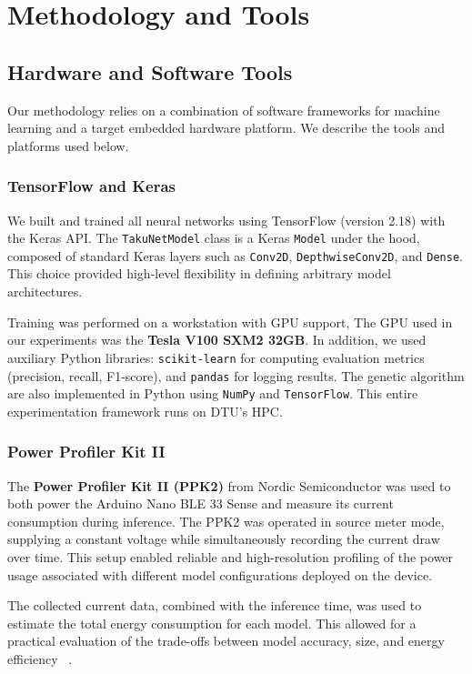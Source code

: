\chapter{Methodology and Tools}
\label{chap:Methodology}

\section{Hardware and Software Tools}

Our methodology relies on a combination of software frameworks for machine learning and a target embedded hardware platform. We describe the tools and platforms used below.

\subsection*{TensorFlow and Keras}

We built and trained all neural networks using TensorFlow (version 2.18) with the Keras API. The \texttt{TakuNetModel} class is a Keras \texttt{Model} under the hood, composed of standard Keras layers such as \texttt{Conv2D}, \texttt{DepthwiseConv2D}, and \texttt{Dense}. This choice provided high-level flexibility in defining arbitrary model architectures.

Training was performed on a workstation with GPU support, The GPU used in our experiments was the \textbf{Tesla V100 SXM2 32GB}.
In addition, we used auxiliary Python libraries: \texttt{scikit-learn} for computing evaluation metrics (precision, recall, F1-score), and \texttt{pandas} for logging results. The genetic algorithm are also implemented in Python using \texttt{NumPy} and \texttt{TensorFlow}. This entire experimentation framework runs on DTU's HPC.

\subsection*{Power Profiler Kit II}

The \textbf{Power Profiler Kit II (PPK2)} from Nordic Semiconductor was used to both power the Arduino Nano BLE 33 Sense and measure its current consumption during inference. The PPK2 was operated in source meter mode, supplying a constant voltage while simultaneously recording the current draw over time. This setup enabled reliable and high-resolution profiling of the power usage associated with different model configurations deployed on the device.

The collected current data, combined with the inference time, was used to estimate the total energy consumption for each model. This allowed for a practical evaluation of the trade-offs between model accuracy, size, and energy efficiency ~\cite{nordicPPK2}.

